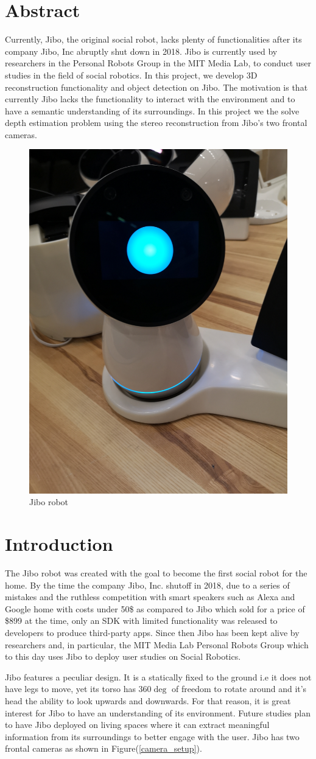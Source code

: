 \documentclass[12pt,letterpaper]{article}
\begin{document}
	
\section{Abstract}
Currently, Jibo, the original social robot, lacks plenty of functionalities after its company Jibo, Inc abruptly shut down in 2018. Jibo is currently used by researchers in the Personal Robots Group in the MIT Media Lab, to conduct user studies in the field of social robotics. In this project, we develop 3D reconstruction functionality and object detection on Jibo. The motivation is that currently Jibo lacks the functionality to interact with the environment and to have a semantic understanding of its surroundings. In this project we the solve depth estimation problem using the stereo reconstruction from Jibo's two frontal cameras.

\begin{figure}[h]
	\centering
	\includegraphics[width=0.2\linewidth]{./images/jibo.jpg}
	\caption{Jibo robot}
\end{figure}

\section{Introduction}
The Jibo robot was created with the goal to become the first social robot for the home. By the time the company Jibo, Inc. shutoff in 2018, due to a series of mistakes and the ruthless competition with smart speakers such as Alexa and Google home with costs under 50\$ as compared to Jibo which sold for a price of \$899 at the time, only an SDK with limited functionality was released to developers to produce third-party apps. Since then Jibo has been kept alive by researchers and, in particular, the MIT Media Lab Personal Robots Group which to this day uses Jibo to deploy user studies on Social Robotics.

Jibo features a peculiar design. It is a statically fixed to the ground i.e it does not have legs to move, yet its torso has 360$\deg$ of freedom to rotate around and it's head the ability to look upwards and downwards. For that reason, it is great interest for Jibo to have an understanding of its environment.  Future studies plan to have Jibo deployed on living spaces where it can extract meaningful information from its surroundings to better engage with the user. Jibo has two frontal cameras as shown in Figure(\ref{camera_setup}).
\end{document}
